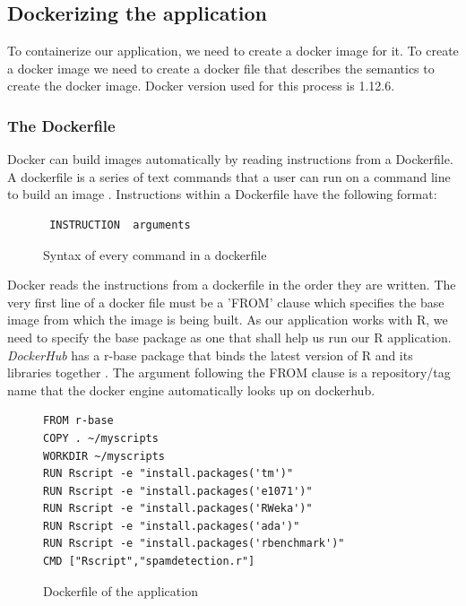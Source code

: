 \documentclass[9pt,twocolumn,twoside]{../../styles/osajnl}
\begin{document}
{\subsection{Dockerizing the application}
To containerize our application, we need to create a docker image for
it. To create a docker image we need to create a docker file that
describes the semantics to create the docker image. Docker version
used for this process is 1.12.6.

\subsubsection{The Dockerfile}
Docker can build images automatically by reading instructions from a
Dockerfile. A dockerfile is a series of text commands that a user can
run on a command line to build an image \cite{www-dockerfile-documentation}.
\newline
Instructions within a Dockerfile have the following format:
\begin{figure}[h]
\begin{verbatim}
 INSTRUCTION  arguments
\end{verbatim}
\caption{Syntax of every command in a dockerfile}
\label{Syntax of every command in a dockerfile}
\end{figure}

\noindent
Docker reads the instructions from a dockerfile in the order they are
written. The very first line of a docker file must be a 'FROM' clause
which specifies the base image from which the image is being built. As
our application works with R, we need to specify the base package as
one that shall help us run our R application. \emph{DockerHub}
\cite{www-dockerhub-libraries} has a r-base package that binds the
latest version of R and its libraries together
\cite{www-rbase-docker}. The argument following the FROM clause is a
repository/tag name that the docker engine automatically looks up on
dockerhub.

\begin{figure}[h]
\begin{verbatim}
FROM r-base
COPY . ~/myscripts
WORKDIR ~/myscripts
RUN Rscript -e "install.packages('tm')"
RUN Rscript -e "install.packages('e1071')"
RUN Rscript -e "install.packages('RWeka')"
RUN Rscript -e "install.packages('ada')"
RUN Rscript -e "install.packages('rbenchmark')"
CMD ["Rscript","spamdetection.r"]
\end{verbatim}
\caption{Dockerfile of the application}
\label{Dockerfile of the application}
\end{figure}

}
\end{document}
